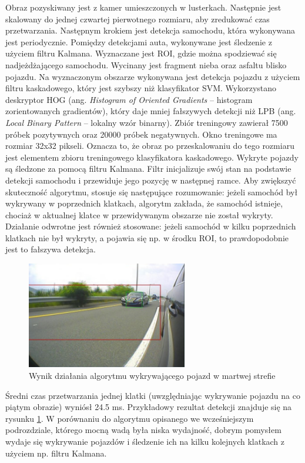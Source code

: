 Obraz pozyskiwany jest z kamer umieszczonych w lusterkach. 
Następnie jest skalowany do jednej czwartej pierwotnego rozmiaru, aby zredukować czas przetwarzania. 
Następnym krokiem jest detekcja samochodu, która wykonywana jest periodycznie. 
Pomiędzy detekcjami auta, wykonywane jest śledzenie z użyciem filtru Kalmana. 
Wyznaczane jest ROI, gdzie można spodziewać się nadjeżdżającego samochodu. 
Wycinany jest fragment nieba oraz asfaltu blisko pojazdu.
Na wyznaczonym obszarze wykonywana jest detekcja pojazdu z użyciem filtru kaskadowego, który jest szybszy niż klasyfikator SVM.
Wykorzystano deskryptor HOG (ang. \textit{Histogram of Oriented Gradients} -- histogram zorientowanych gradientów), który daje mniej fałszywych detekcji niż LPB (ang. \textit{Local Binary Pattern} -- lokalny wzór binarny).
Zbiór treningowy zawierał 7500 próbek pozytywnych oraz 20000 próbek negatywnych. 
Okno treningowe ma rozmiar 32x32 pikseli. Oznacza to, że obraz po przeskalowaniu do tego rozmiaru jest elementem zbioru treningowego klasyfikatora kaskadowego.
Wykryte pojazdy są śledzone za pomocą filtru Kalmana. 
Filtr inicjalizuje swój stan na podstawie detekcji samochodu i przewiduje jego pozycję w następnej ramce.
Aby zwiększyć skuteczność algorytmu, stosuje się następujące rozumowanie: jeżeli samochód był wykrywany w poprzednich klatkach, algorytm zakłada, że samochód istnieje, chociaż w aktualnej klatce w przewidywanym obszarze nie został wykryty. 
Działanie odwrotne jest również stosowane: jeżeli samochód w kilku poprzednich klatkach nie był wykryty, a pojawia się np. w środku ROI, to prawdopodobnie jest to fałszywa detekcja. 

\begin{figure}
  \centering
  \includegraphics[width=7cm]{img/car_detection2_result.png}
  \caption{Wynik działania algorytmu wykrywającego pojazd w martwej strefie\cite{T12}}
  \label{fig:car_detection2_result}
\end{figure}

Średni czas przetwarzania jednej klatki (uwzględniając wykrywanie pojazdu na co piątym obrazie) wyniósł 24.5 ms. 
Przykładowy rezultat detekcji znajduje się na rysunku \ref{fig:car_detection2_result}.
W porównaniu do algorytmu opisanego we wcześniejszym podrozdziale, którego mocną wadą była niska wydajność, dobrym pomysłem wydaje się wykrywanie pojazdów i śledzenie ich na kilku kolejnych klatkach z użyciem np. filtru Kalmana.

